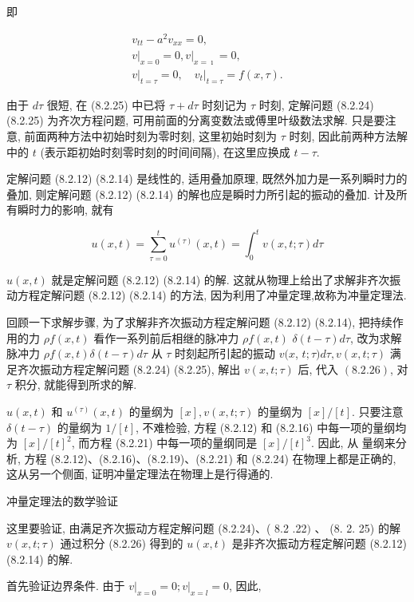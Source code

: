 即

$$
\begin{gathered}
v_{t t}-a^{2} v_{x x}=0, \\
\left.v\right|_{x=0}=0,\left.v\right|_{x=\imath}=0, \\
\left.v\right|_{t=\tau}=0,\left.\quad v_{t}\right|_{t=\tau}=f(x, \tau) .
\end{gathered}
$$

由于 $d \tau$ 很短, 在 (8.2.25) 中已将 $\tau+d \tau$ 时刻记为 $\tau$ 时刻, 定解问题 (8.2.24) (8.2.25) 为齐次方程问题, 可用前面的分离变数法或傅里叶级数法求解. 只是要注意, 前面两种方法中初始时刻为零时刻, 这里初始时刻为 $\tau$ 时刻, 因此前两种方法解中的 $t$ (表示距初始时刻零时刻的时间间隔), 在这里应换成 $t-\tau$.

定解问题 (8.2.12) (8.2.14) 是线性的, 适用叠加原理, 既然外加力是一系列瞬时力的叠加, 则定解问题 (8.2.12) (8.2.14) 的解也应是瞬时力所引起的振动的叠加. 计及所有瞬时力的影响, 就有

$$
u(x, t)=\sum_{\tau=0}^{t} u^{(\tau)}(x, t)=\int_{0}^{t} v(x, t ; \tau) d \tau
$$

$u(x, t)$ 就是定解问题 (8.2.12) (8.2.14) 的解. 这就从物理上给出了求解非齐次振动方程定解问题 (8.2.12) (8.2.14) 的方法, 因为利用了冲量定理,故称为冲量定理法.

回顾一下求解步骤, 为了求解非齐次振动方程定解问题 (8.2.12) (8.2.14), 把持续作用的力 $\rho f(x, t)$ 看作一系列前后相继的脉冲力 $\rho f(x, t)$ $\delta(t-\tau) d \tau$, 改为求解脉冲力 $\rho f(x, t) \delta(t-\tau) d \tau$ 从 $\tau$ 时刻起所引起的振动 $v(x$, $t ; \tau) d \tau, v(x, t ; \tau)$ 满足齐次振动方程定解问题 (8.2.24) (8.2.25), 解出 $v(x, t ; \tau)$ 后, 代入 $(8.2 .26)$, 对 $\tau$ 积分, 就能得到所求的解.

$u(x, t)$ 和 $u^{(\tau)}(x, t)$ 的量纲为 $[x], v(x, t ; \tau)$ 的量纲为 $[x] /[t]$. 只要注意 $\delta(t-\tau)$ 的量纲为 $1 /[t]$, 不难检验, 方程 (8.2.12) 和 (8.2.16) 中每一项的量纲均为 $[x] /[t]^{2}$, 而方程 (8.2.21) 中每一项的量纲同是 $[x] /[t]^{3}$. 因此, 从
量纲来分析, 方程 (8.2.12)、(8.2.16)、(8.2.19)、(8.2.21) 和 (8.2.24) 在物理上都是正确的, 这从另一个侧面, 证明冲量定理法在物理上是行得通的.

冲量定理法的数学验证

这里要验证, 由满足齐次振动方程定解问题 (8.2.24)、( 8.2 .22$)$ 、 (8. 2. 25) 的解 $v(x, t ; \tau)$ 通过积分 (8.2.26) 得到的 $u(x, t)$ 是非齐次振动方程定解问题 (8.2.12) (8.2.14) 的解.

首先验证边界条件. 由于 $\left.v\right|_{x=0}=0 ;\left.v\right|_{x=l}=0$, 因此,

